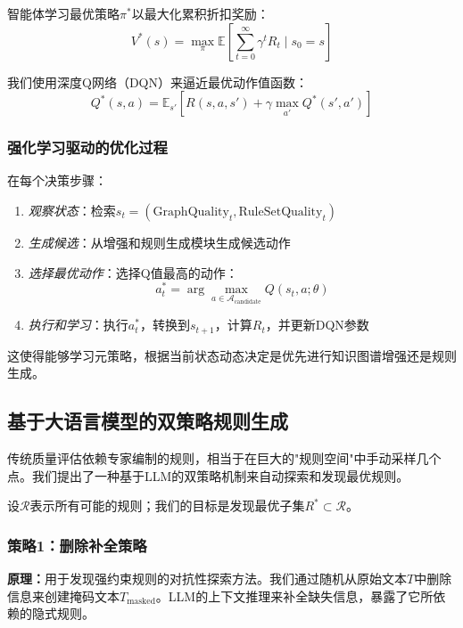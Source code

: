 \documentclass[runningheads]{llncs}
\begin{document}
智能体学习最优策略$\pi^*$以最大化累积折扣奖励：
\begin{equation}
V^*(s) = \max_{\pi} \mathbb{E} \left[ \sum_{t=0}^{\infty} \gamma^t R_{t} \mid s_0 = s \right]
\end{equation}

我们使用深度Q网络（DQN）来逼近最优动作值函数：
\begin{equation}
Q^*(s, a) = \mathbb{E}_{s'} \left[ R(s, a, s') + \gamma \max_{a'} Q^*(s', a') \right]
\end{equation}

\subsubsection{强化学习驱动的优化过程}
在每个决策步骤：
\begin{enumerate}
    \item \textit{观察状态}：检索$s_t = (\text{GraphQuality}_t, \text{RuleSetQuality}_t)$
    \item \textit{生成候选}：从增强和规则生成模块生成候选动作
    \item \textit{选择最优动作}：选择Q值最高的动作：
    \begin{equation}
    a^*_t = \arg\max_{a \in \mathcal{A}_{\text{candidate}}} Q(s_t, a; \theta)
    \end{equation}
    \item \textit{执行和学习}：执行$a^*_t$，转换到$s_{t+1}$，计算$R_t$，并更新DQN参数
\end{enumerate}

这使得能够学习元策略，根据当前状态动态决定是优先进行知识图谱增强还是规则生成。

\subsection{基于大语言模型的双策略规则生成}
\label{subsec:llm_rule}

传统质量评估依赖专家编制的规则，相当于在巨大的"规则空间"中手动采样几个点。我们提出了一种基于LLM的双策略机制来自动探索和发现最优规则。

设$\mathcal{R}$表示所有可能的规则；我们的目标是发现最优子集$R^* \subset \mathcal{R}$。

\subsubsection{策略1：删除补全策略}

\textbf{原理：}用于发现强约束规则的对抗性探索方法。我们通过随机从原始文本$T$中删除信息来创建掩码文本$T_{\text{masked}}$。LLM的上下文推理来补全缺失信息，暴露了它所依赖的隐式规则。
\end{document}
